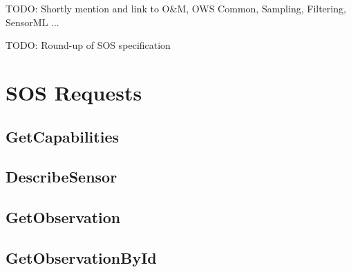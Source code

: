 \documentclass{article}
\begin{document}
TODO: Shortly mention and link to O&M, OWS Common, Sampling, Filtering, SensorML ...

TODO: Round-up of SOS specification

\section{SOS Requests}

\subsection{GetCapabilities}


\subsection{DescribeSensor}


\subsection{GetObservation}


\subsection{GetObservationById}
\end{document}
